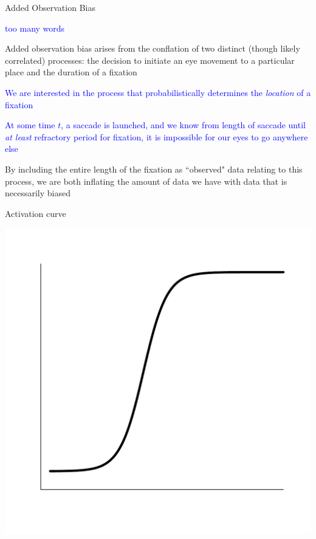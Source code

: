 \documentclass{beamer}
\newcommand{\vp}{\vspace{2mm}}
\providecommand{\cn}[1]{\textcolor{blue}{#1}}
\begin{document}
\begin{frame}{Added Observation Bias}

\cn{too many words} \vp

Added observation bias arises from the conflation of two distinct (though likely correlated) processes: the decision to initiate an eye movement to a particular place and the duration of a fixation\vp

\cn{We are interested in the process that probabilistically determines the \textit{location} of a fixation} \vp

\cn{At some time $t$, a saccade is launched, and we know from length of saccade until \textit{at least} refractory period for fixation, it is impossible for our eyes to go anywhere else} \vp

By including the entire length of the fixation as ``observed" data relating to this process, we are both inflating the amount of data we have with data that is necessarily biased
\end{frame}


\begin{frame}{Activation curve}
\vspace{-5mm}
\begin{center}
\includegraphics[scale=0.4]{img/logistic_a.pdf}
\end{center}


\end{frame}
\end{document}
